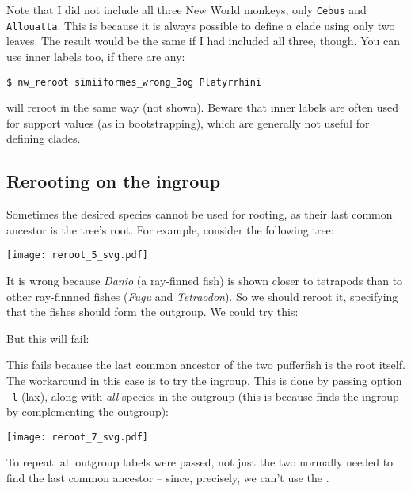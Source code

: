 \noindent{}Note that I did not include all three New World monkeys, only \texttt{Cebus} and \texttt{Allouatta}. This is because it is always possible to define a clade using only two leaves. The result would be the same if I had included all three, though. You can use inner labels too, if there are any:
\begin{verbatim}
$ nw_reroot simiiformes_wrong_3og Platyrrhini
\end{verbatim}
will reroot in the same way (not shown). Beware that inner labels are often
used for support values (as in bootstrapping), which are generally not useful
for defining clades.

\subsection{Rerooting on the ingroup}

Sometimes the desired species cannot be used for rooting, as their last common ancestor is the tree's root. For example, consider the following tree:

\texttt{[image: reroot\_5\_svg.pdf]}

\noindent{}It is wrong because \textit{Danio} (a ray-finned fish) is shown
closer to tetrapods than to other ray-finnned fishes (\textit{Fugu} and
\textit{Tetraodon}). So we should reroot it, specifying that the fishes should
form the outgroup. We could try this:



\noindent{}But this will fail:



\noindent{}This fails because the last common ancestor of the two pufferfish is
the root itself. The workaround in this case is to try the ingroup. This is
done by passing option \texttt{-l} (lax), along with \emph{all} species in the
outgroup (this is because \reroot{} finds the ingroup by complementing the outgroup):


\texttt{[image: reroot\_7\_svg.pdf]}

\noindent{}To repeat: all outgroup labels were passed, not just the two
normally needed to find the last common ancestor -- since, precisely, we can't
use the \lca.
